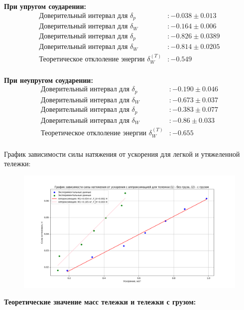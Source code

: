 \documentclass[a4paper]{article}
\begin{document}
\begin{center}
\textbf{При упругом соударении:}
\begin{align*}
\text{Доверительный интервал для } \delta_p &: -0.038 \pm 0.013 \\
\text{Доверительный интервал для } \delta_W &: -0.164 \pm 0.006 \\
\text{Доверительный интервал для } \delta_p &: -0.826 \pm 0.0389\\
\text{Доверительный интервал для } \delta_W &: -0.814 \pm 0.0205\\
\text{Теоретическое отклоление энергии } \delta_W^{(T)} &: -0.549\\
\end{align*}

\textbf{При неупругом соударении:}
\begin{align*}
\text{Доверительный интервал для } \delta_p &: -0.190 \pm 0.046 \\
\text{Доверительный интервал для } \delta_W &: -0.673 \pm 0.037 \\
\text{Доверительный интервал для } \delta_p &: -0.383 \pm 0.077 \\
\text{Доверительный интервал для } \delta_W &: -0.86 \pm 0.033 \\
\text{Теоретическое отклоление энергии } \delta_W^{(T)} &: -0.655\\
\end{align*}
\end{center}
График зависимости силы натяжения от ускорения для легкой и утяжеленной тележки:
\begin{figure}[H]
\begin{center}
\includegraphics[width=\textwidth, scale=0.5]{Figure_1.png}
\end{center}
\end{figure}
\textbf{Теоретические значение масс тележки и тележки с грузом:}
\end{document}

